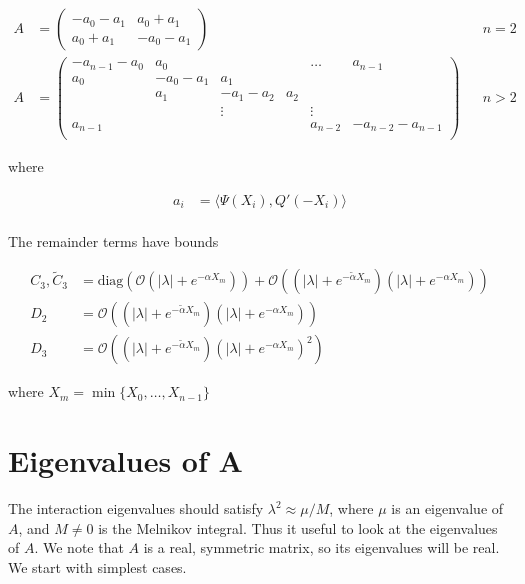 \documentclass[12pt]{article}
\begin{document}
\begin{align*}
A &= \begin{pmatrix}
-a_0 -a_1 & a_0 + a_1 \\
a_0 + a_1 & -a_0 - a_1
\end{pmatrix} && n = 2 \\
A &= \begin{pmatrix}
-a_{n-1} - a_0 & a_0 & & & \dots & a_{n-1}\\
a_0 & -a_0 - a_1 &  a_1 \\
& a_1 & -a_1 - a_2 &  a_2 \\
& & \vdots & & \vdots \\
a_{n-1} & & & & a_{n-2} & -a_{n-2} - a_{n-1} \\
\end{pmatrix} && n > 2
\end{align*}

where

\begin{align*}
a_i &= \langle \Psi(X_i), Q'(-X_i) \rangle \\
\end{align*}

The remainder terms have bounds

\begin{align*}
C_3, \tilde{C}_3 &= \text{diag}(\mathcal{O}(|\lambda| + e^{-\alpha X_m})) 
+ \mathcal{O}((|\lambda| + e^{-\tilde{\alpha} X_m})( |\lambda| + e^{-\alpha X_m})) \\
D_2 &= \mathcal{O}((|\lambda| + e^{-\tilde{\alpha} X_m})(|\lambda| + e^{-\alpha X_m})) \\
D_3 &= \mathcal{O}((|\lambda| + e^{-\tilde{\alpha} X_m})(|\lambda| + e^{-\alpha X_m})^2)
\end{align*}

where $X_m = \min \{X_0, \dots, X_{n-1}\}$

\section{Eigenvalues of A}

The interaction eigenvalues should satisfy $\lambda^2 \approx \mu / M$, where $\mu$ is an eigenvalue of $A$, and $M \neq 0$ is the Melnikov integral. Thus it useful to look at the eigenvalues of $A$. We note that $A$ is a real, symmetric matrix, so its eigenvalues will be real. We start with simplest cases.
\end{document}
